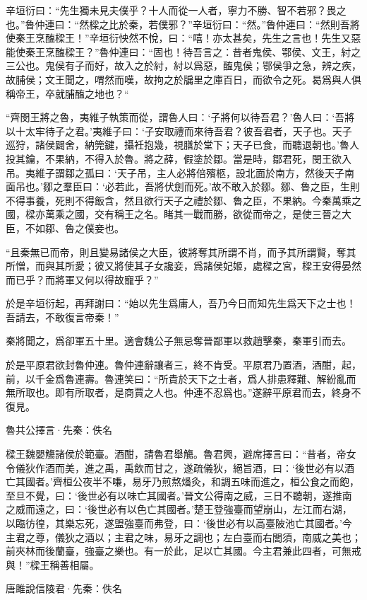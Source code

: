 \documentclass[12pt,a4paper]{ctexbook}
\begin{document}
辛垣衍曰：“先生獨未見夫僕乎？十人而從一人者，寧力不勝、智不若邪？畏之也。”魯仲連曰：“然樑之比於秦，若僕邪？”辛垣衍曰：“然。”魯仲連曰：“然則吾將使秦王烹醢樑王！”辛垣衍怏然不悅，曰：“嘻！亦太甚矣，先生之言也！先生又惡能使秦王烹醢樑王？”魯仲連曰：“固也！待吾言之：昔者鬼侯、鄂侯、文王，紂之三公也。鬼侯有子而好，故入之於紂，紂以爲惡，醢鬼侯；鄂侯爭之急，辨之疾，故脯侯；文王聞之，喟然而嘆，故拘之於牖里之庫百日，而欲令之死。曷爲與人俱稱帝王，卒就脯醢之地也？“\par
“齊閔王將之魯，夷維子執策而從，謂魯人曰：‘子將何以待吾君？’魯人曰：‘吾將以十太牢待子之君。’夷維子曰：‘子安取禮而來待吾君？彼吾君者，天子也。天子巡狩，諸侯闢舍，納筦鍵，攝衽抱幾，視膳於堂下；天子已食，而聽退朝也。’魯人投其鑰，不果納，不得入於魯。將之薛，假塗於鄒。當是時，鄒君死，閔王欲入吊。夷維子謂鄒之孤曰：‘天子吊，主人必將倍殯柩，設北面於南方，然後天子南面吊也。’鄒之羣臣曰：‘必若此，吾將伏劍而死。’故不敢入於鄒。鄒、魯之臣，生則不得事養，死則不得飯含，然且欲行天子之禮於鄒、魯之臣，不果納。今秦萬乘之國，樑亦萬乘之國，交有稱王之名。睹其一戰而勝，欲從而帝之，是使三晉之大臣，不如鄒、魯之僕妾也。\par
“且秦無已而帝，則且變易諸侯之大臣，彼將奪其所謂不肖，而予其所謂賢，奪其所憎，而與其所愛；彼又將使其子女讒妾，爲諸侯妃姬，處樑之宮，樑王安得晏然而已乎？而將軍又何以得故寵乎？”\par
於是辛垣衍起，再拜謝曰：“始以先生爲庸人，吾乃今日而知先生爲天下之士也！吾請去，不敢復言帝秦！”\par
秦將聞之，爲卻軍五十里。適會魏公子無忌奪晉鄙軍以救趙擊秦，秦軍引而去。\par
於是平原君欲封魯仲連。魯仲連辭讓者三，終不肯受。平原君乃置酒，酒酣，起，前，以千金爲魯連壽。魯連笑曰：“所貴於天下之士者，爲人排患釋難、解紛亂而無所取也。即有所取者，是商賈之人也。仲連不忍爲也。”遂辭平原君而去，終身不復見。\par
魯共公擇言·先秦：佚名 \par
樑王魏嬰觴諸侯於範臺。酒酣，請魯君舉觴。魯君興，避席擇言曰：“昔者，帝女令儀狄作酒而美，進之禹，禹飲而甘之，遂疏儀狄，絕旨酒，曰：‘後世必有以酒亡其國者。’齊桓公夜半不嗛，易牙乃煎熬燔灸，和調五味而進之，桓公食之而飽，至旦不覺，曰：‘後世必有以味亡其國者。’晉文公得南之威，三日不聽朝，遂推南之威而遠之，曰：‘後世必有以色亡其國者。’楚王登強臺而望崩山，左江而右湖，以臨彷徨，其樂忘死，遂盟強臺而弗登，曰：‘後世必有以高臺陂池亡其國者。’今主君之尊，儀狄之酒以；主君之味，易牙之調也；左白臺而右閭須，南威之美也；前夾林而後蘭臺，強臺之樂也。有一於此，足以亡其國。今主君兼此四者，可無戒與！”樑王稱善相屬。\par
唐雎說信陵君·先秦：佚名 \par
\end{document}
